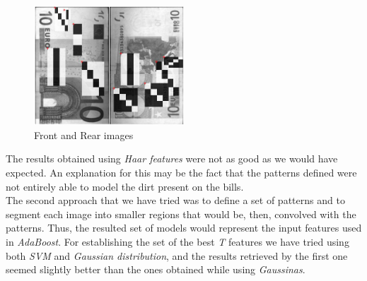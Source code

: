 \documentclass[11pt,twocolumn]{article}
\begin{document}
\begin{figure}[!hbtp]
\centering
\includegraphics[width=0.5\textwidth]{img/haar.jpg}
\caption{Front and Rear images}
\label{Haar_features}
\end{figure}
	\hspace*{10px}The results obtained using \emph{Haar features} were not as good as we would have expected. An explanation for this may be the fact that the patterns defined were not entirely able to model the dirt present on the bills.\\
	\hspace*{10px}The second approach that we have tried was to define a set of patterns and to segment each image into smaller regions that would be, then, convolved with the patterns. Thus, the resulted set of models would represent the input features used in \emph{AdaBoost}. For establishing the set of the best \emph{T} features we have tried using both \emph{SVM} and \emph{Gaussian distribution}, and the results retrieved by the first one seemed slightly better than the ones obtained while using \emph{Gaussinas}.\\
	\hspace*{10px}          
 			
\end{document}
